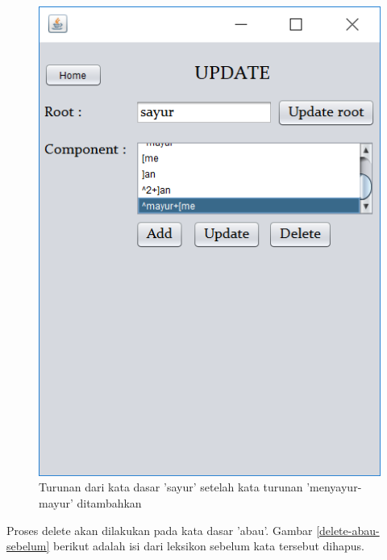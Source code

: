 \begin{figure}[H]
\centering
\includegraphics[scale=0.7]{Gambar/update-menyayurmayur-setelah}
\caption{Turunan dari kata dasar 'sayur' setelah kata turunan 'menyayur-mayur' ditambahkan} 
\label{update-menyayurmayur-setelah}
\end{figure}

Proses delete akan dilakukan pada kata dasar 'abau'. Gambar \ref{delete-abau-sebelum} berikut adalah isi dari leksikon sebelum kata tersebut dihapus.

